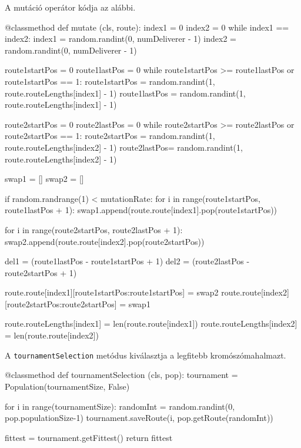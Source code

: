A mutáció operátor kódja az alábbi.
\begin{python}
@classmethod
def mutate (cls, route):
    index1 = 0
    index2 = 0
    while index1 == index2:
        index1 = random.randint(0, numDeliverer - 1)
        index2 = random.randint(0, numDeliverer - 1)

    route1startPos = 0
    route1lastPos = 0
    while route1startPos >= route1lastPos or route1startPos == 1:
        route1startPos =
          random.randint(1, route.routeLengths[index1] - 1)
        route1lastPos =
          random.randint(1, route.routeLengths[index1] - 1)

    route2startPos = 0
    route2lastPos = 0
    while route2startPos >= route2lastPos or route2startPos == 1:
        route2startPos =
          random.randint(1, route.routeLengths[index2] - 1)
        route2lastPos= random.randint(1, route.routeLengths[index2] - 1)

    swap1 = []
    swap2 = [] 

    if random.randrange(1) < mutationRate:
        for i in range(route1startPos, route1lastPos + 1):
            swap1.append(route.route[index1].pop(route1startPos))

        for i in range(route2startPos, route2lastPos + 1):
            swap2.append(route.route[index2].pop(route2startPos))

        del1 = (route1lastPos - route1startPos + 1)
        del2 = (route2lastPos - route2startPos + 1)

        route.route[index1][route1startPos:route1startPos] = swap2
        route.route[index2][route2startPos:route2startPos] = swap1

        route.routeLengths[index1] = len(route.route[index1])
        route.routeLengths[index2] = len(route.route[index2])
\end{python}

A \texttt{tournamentSelection} metódus kiválasztja a legfitebb kromószómahalmazt.

\begin{python}
@classmethod
def tournamentSelection (cls, pop):
    tournament = Population(tournamentSize, False)

    for i in range(tournamentSize):
        randomInt = random.randint(0, pop.populationSize-1)
        tournament.saveRoute(i, pop.getRoute(randomInt))

    fittest = tournament.getFittest()
    return fittest
\end{python}

